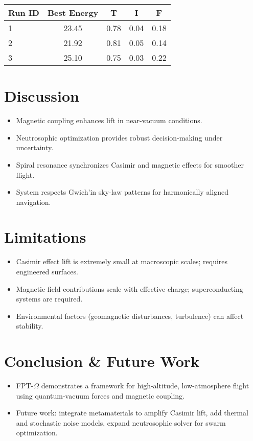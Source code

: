 \documentclass[12pt]{article}
\begin{document}
\begin{table}[h!]
\centering
\begin{tabular}{lcccc}
\toprule
Run ID & Best Energy & T & I & F \\
\midrule
1 & 23.45 & 0.78 & 0.04 & 0.18 \\
2 & 21.92 & 0.81 & 0.05 & 0.14 \\
3 & 25.10 & 0.75 & 0.03 & 0.22 \\
\bottomrule
\end{tabular}
\end{table}

\section{Discussion}
\begin{itemize}
    \item Magnetic coupling enhances lift in near-vacuum conditions.
    \item Neutrosophic optimization provides robust decision-making under uncertainty.
    \item Spiral resonance synchronizes Casimir and magnetic effects for smoother flight.
    \item System respects Gwich’in sky-law patterns for harmonically aligned navigation.
\end{itemize}

\section{Limitations}
\begin{itemize}
    \item Casimir effect lift is extremely small at macroscopic scales; requires engineered surfaces.
    \item Magnetic field contributions scale with effective charge; superconducting systems are required.
    \item Environmental factors (geomagnetic disturbances, turbulence) can affect stability.
\end{itemize}

\section{Conclusion \& Future Work}
\begin{itemize}
    \item FPT-$\Omega$ demonstrates a framework for high-altitude, low-atmosphere flight using quantum-vacuum forces and magnetic coupling.
    \item Future work: integrate metamaterials to amplify Casimir lift, add thermal and stochastic noise models, expand neutrosophic solver for swarm optimization.
\end{itemize}
\end{document}
